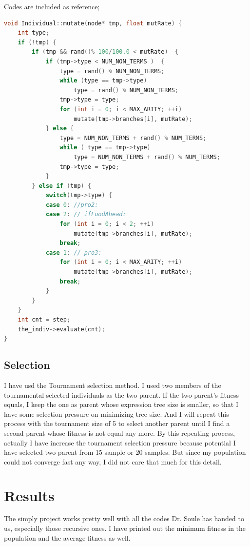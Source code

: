 \documentclass[10pt,b5paper]{article}
\begin{document}
Codes are included as reference; 
\begin{lstlisting}[language=c++]
void Individual::mutate(node* tmp, float mutRate) {
    int type;
    if (!tmp) {
        if (tmp && rand()% 100/100.0 < mutRate)  {
            if (tmp->type < NUM_NON_TERMS )  {
                type = rand() % NUM_NON_TERMS;
                while (type == tmp->type)               
                    type = rand() % NUM_NON_TERMS; 
                tmp->type = type;
                for (int i = 0; i < MAX_ARITY; ++i)
                    mutate(tmp->branches[i], mutRate);
            } else {
                type = NUM_NON_TERMS + rand() % NUM_TERMS;
                while ( type == tmp->type)
                    type = NUM_NON_TERMS + rand() % NUM_TERMS;
                tmp->type = type;
            }
        } else if (tmp) {    
            switch(tmp->type) {
            case 0: //pro2:
            case 2: // ifFoodAhead:
                for (int i = 0; i < 2; ++i)
                    mutate(tmp->branches[i], mutRate);
                break;
            case 1: // pro3:
                for (int i = 0; i < MAX_ARITY; ++i)
                    mutate(tmp->branches[i], mutRate);
                break;
            }
        }
    }
    int cnt = step;
    the_indiv->evaluate(cnt);
}
\end{lstlisting}
\subsection{Selection}
\label{sec-1-5}
I have usd the Tournament selection method. I used two members of the tournamental selected individuals as the two parent. If the two parent's fitness equals, I keep the one as parent whose expression tree size is smaller, so that I have some selection pressure on minimizing tree size. And I will repeat this process with the tournament size of 5 to select another parent until I find a second parent whose fitness is not equal any more. By this repeating process, actually I have increase the tournament selection pressure because potential I have selected two parent from 15 sample or 20 samples. But since my population could not converge fast any way, I did not care that much for this detail. 
\section{Results}
\label{sec-2}
The simply project works pretty well with all the codes Dr. Soule has handed to us, especially those recursive ones. I have printed out the minimum fitness in the population and the average fitness as well. 
\end{document}

